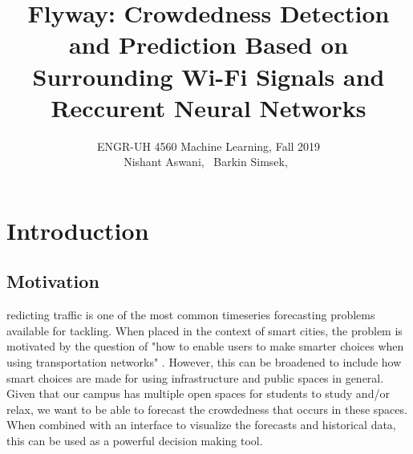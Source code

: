 \documentclass[journal, 12pt]{IEEEtran}
\begin{document}
{}
\setcounter{page}{1}

\title{\Large{Flyway: Crowdedness Detection and Prediction Based on Surrounding Wi-Fi Signals and Reccurent Neural Networks}}

\author{ ENGR-UH 4560 Machine Learning, Fall 2019\\
\medskip
Nishant Aswani,~ \;\;
Barkin Simsek,~}%


%
{}

\maketitle




\section{Introduction}
\subsection{Motivation}
\lowercase{redicting} traffic is one of the most common timeseries forecasting problems available for tackling. When placed in the context of smart cities, the problem is motivated by the question of "how to enable users to make smarter choices when using transportation networks" \cite{lv2014traffic}. However, this can be broadened to include how smart choices are made for using infrastructure and public spaces in general. \\

\noindent Given that our campus has multiple open spaces for students to study and/or relax, we want to be able to forecast the crowdedness that occurs in these spaces. When combined with an interface to visualize the forecasts and historical data, this can be used as a powerful decision making tool.
\end{document}
